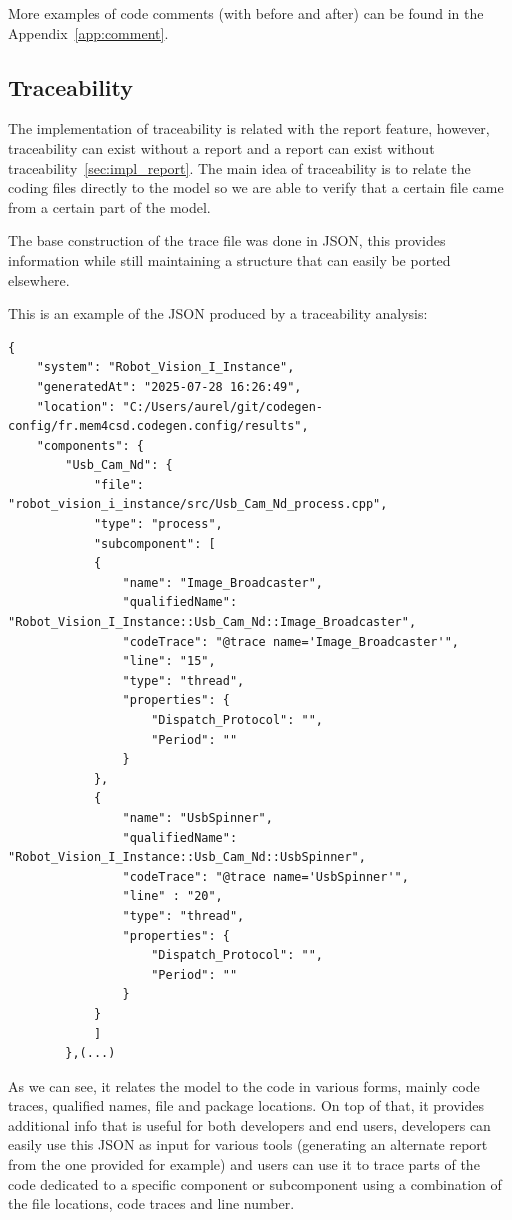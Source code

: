 More examples of code comments (with before and after) can be found in the Appendix~\ref{app:comment}.


\subsection{Traceability}
\label{sec:impl_trace}

The implementation of traceability is related with the report feature, however, traceability can exist without a report and a report can exist without traceability~\ref{sec:impl_report}. The main idea of traceability is to relate the coding files directly to the model so we are able to verify that a certain file came from a certain part of the model.

The base construction of the trace file was done in JSON, this provides information while still maintaining a structure that can easily be ported elsewhere.

This is an example of the JSON produced by a traceability analysis:

\begin{verbatim}
{
	"system": "Robot_Vision_I_Instance",
	"generatedAt": "2025-07-28 16:26:49",
	"location": "C:/Users/aurel/git/codegen-config/fr.mem4csd.codegen.config/results",
	"components": {
		"Usb_Cam_Nd": {
			"file": "robot_vision_i_instance/src/Usb_Cam_Nd_process.cpp",
			"type": "process",
			"subcomponent": [
			{
				"name": "Image_Broadcaster",
				"qualifiedName": "Robot_Vision_I_Instance::Usb_Cam_Nd::Image_Broadcaster",
				"codeTrace": "@trace name='Image_Broadcaster'",
				"line": "15",
				"type": "thread",
				"properties": {
					"Dispatch_Protocol": "",
					"Period": ""
				}
			},
			{
				"name": "UsbSpinner",
				"qualifiedName": "Robot_Vision_I_Instance::Usb_Cam_Nd::UsbSpinner",
				"codeTrace": "@trace name='UsbSpinner'",
				"line" : "20",
				"type": "thread",
				"properties": {
					"Dispatch_Protocol": "",
					"Period": ""
				}
			}
			]
		},(...)
\end{verbatim}

As we can see, it relates the model to the code in various forms, mainly code traces, qualified names, file and package locations. On top of that, it provides additional info that is useful for both developers and end users, developers can easily use this \gls{JSON} as input for various tools (generating an alternate report from the one provided for example) and users can use it to trace parts of the code dedicated to a specific component or subcomponent using a combination of the file locations, code traces and line number.

